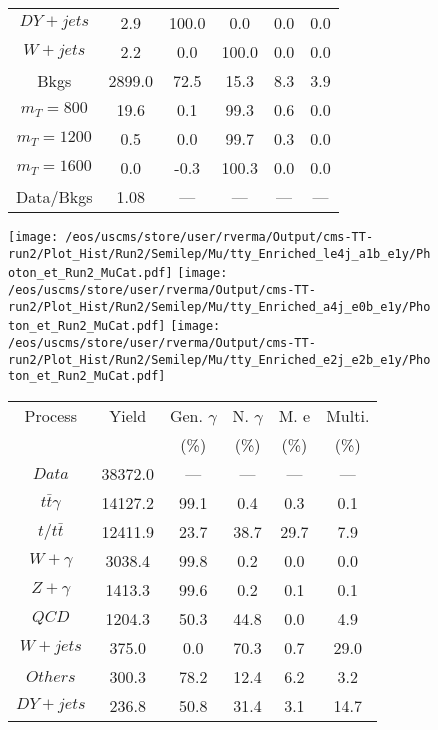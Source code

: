 \begin{figure}
\begin{minipage}[c]{0.32\textwidth}
{\begin{tabular}{cccccc}
$ DY+jets $ &  2.9 &  100.0 &  0.0 &  0.0 &  0.0\\
$ W+jets $ &  2.2 &  0.0 &  100.0 &  0.0 &  0.0\\
Bkgs &  2899.0 &  72.5 &  15.3 &  8.3 &  3.9\\
$ m_{T} = 800 $ &  19.6 &  0.1 &  99.3 &  0.6 &  0.0\\
$ m_{T} = 1200 $ &  0.5 &  0.0 &  99.7 &  0.3 &  0.0\\
$ m_{T} = 1600 $ &  0.0 &  -0.3 &  100.3 &  0.0 &  0.0\\
Data/Bkgs &  1.08 &  --- &  --- &  --- &  ---\\
\hline
\end{tabular}
}
\end{minipage}
\end{figure}

\begin{figure}
\centering
\texttt{[image: /eos/uscms/store/user/rverma/Output/cms-TT-run2/Plot\_Hist/Run2/Semilep/Mu/tty\_Enriched\_le4j\_a1b\_e1y/Photon\_et\_Run2\_MuCat.pdf]}
\texttt{[image: /eos/uscms/store/user/rverma/Output/cms-TT-run2/Plot\_Hist/Run2/Semilep/Mu/tty\_Enriched\_a4j\_e0b\_e1y/Photon\_et\_Run2\_MuCat.pdf]}
\texttt{[image: /eos/uscms/store/user/rverma/Output/cms-TT-run2/Plot\_Hist/Run2/Semilep/Mu/tty\_Enriched\_e2j\_e2b\_e1y/Photon\_et\_Run2\_MuCat.pdf]}
\begin{minipage}[c]{0.32\textwidth}
\centering
\tiny{
\begin{tabular}{cccccc}
\hline
Process & Yield & Gen. $\gamma$ & N. $\gamma$ & M. e & Multi. \\
 &  & (\%) & (\%) & (\%) & (\%)  \\
\hline
                                                                      $ Data $ &  38372.0 &  --- &  --- &  --- &  ---\\
$ t\bar{t}\gamma $ &  14127.2 &  99.1 &  0.4 &  0.3 &  0.1\\
$ t/t\bar{t} $ &  12411.9 &  23.7 &  38.7 &  29.7 &  7.9\\
$ W+\gamma $ &  3038.4 &  99.8 &  0.2 &  0.0 &  0.0\\
$ Z+\gamma $ &  1413.3 &  99.6 &  0.2 &  0.1 &  0.1\\
$ QCD $ &  1204.3 &  50.3 &  44.8 &  0.0 &  4.9\\
$ W+jets $ &  375.0 &  0.0 &  70.3 &  0.7 &  29.0\\
$ Others $ &  300.3 &  78.2 &  12.4 &  6.2 &  3.2\\
$ DY+jets $ &  236.8 &  50.8 &  31.4 &  3.1 &  14.7\\

\end{tabular}}
\end{minipage}
\end{figure}
